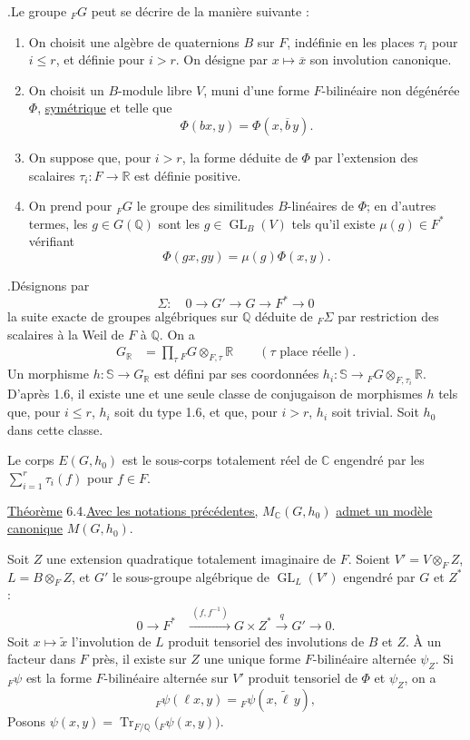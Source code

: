 \documentclass[10pt]{article}
\newcommand{\C}{\mathbb C}
\newcommand{\Q}{\mathbb Q}
\newcommand{\R}{\mathbb R}
\newcommand{\bS}{\mathbb S}
\newcommand{\GL}{\operatorname{GL}}
\newcommand{\MC}{M_{\C}}
\newcommand{\Tr}{\operatorname{Tr}}
\begin{document}
.\quad Le groupe ${}_FG$ peut se décrire de la manière suivante :
\begin{enumerate}[label=(\alph*)]
\item On choisit une algèbre de quaternions $B$ sur $F$, indéfinie en les places $\tau_i$ pour $i\le r$, et définie pour $i>r$. On désigne par $x\mapsto\overline{x}$ son involution canonique.
\item On choisit un $B$-module libre $V$, muni d'une forme $F$-bilinéaire non dégénérée $\Phi$, \uline{symétrique} et telle que
\[
\Phi(bx,y)=\Phi(x,\overline b\,y).
\]
\item On suppose que, pour $i>r$, la forme déduite de $\Phi$ par l'extension des scalaires $\tau_i:F\to\R$ est définie positive.
\item On prend pour ${}_FG$ le groupe des similitudes $B$-linéaires de $\Phi$; en d'autres termes, les $g\in G(\Q)$ sont les $g\in\GL_B(V)$ tels qu'il existe $\mu(g)\in F^*$ vérifiant
\[
\Phi(gx,gy)=\mu(g)\Phi(x,y).
\]
\end{enumerate}
.\quad Désignons par
\[
\Sigma:\quad 0\longrightarrow G'\longrightarrow G\longrightarrow F^*\longrightarrow0
\]
la suite exacte de groupes algébriques sur $\Q$ déduite de ${}_F\Sigma$ par restriction des scalaires à la Weil de $F$ à $\Q$. On a
\begingroup
\makeatletter
\tagsleft@true
\makeatother
\begin{align}
G_{\R}&=\prod_{\tau}{}_FG\otimes_{F,\tau}\R
\qquad(\tau\text{ place réelle}). \tag{6.3.1}
\end{align}
\endgroup
Un morphisme $h:\bS\to G_\R$ est défini par ses coordonnées $h_i:\bS\longrightarrow {}_FG\otimes_{F,\tau_i}\R$.
D'après 1.6, il existe une et une seule classe de conjugaison de morphismes $h$ tels que, pour $i\le r$, $h_i$ soit du type 1.6, et que, pour $i>r$, $h_i$ soit trivial. Soit $h_0$ dans cette classe.

Le corps $E(G,h_0)$ est le sous-corps totalement réel de $\C$ engendré par les $\displaystyle\sum_{i=1}^r\tau_i(f)$ pour $f\in F$.

\noindent \uline{Théorème} 6.4.\quad \uline{Avec les notations précédentes,} $\MC(G,h_0)$ \uline{admet un modèle canonique} $M(G,h_0)$.

Soit $Z$ une extension quadratique totalement imaginaire de $F$. Soient $V'=V\otimes_F Z$, $L=B\otimes_F Z$, et $G'$ le sous-groupe algébrique de $\GL_L(V')$ engendré par $G$ et $Z^*$ :
\begingroup
\makeatletter
\tagsleft@true
\makeatother
\begin{align}
0\longrightarrow F^*&\xrightarrow{\ (f,f^{-1})\ }G\times Z^*
 \xrightarrow{\ q\ }G'\longrightarrow0. \tag{6.4.1}
\end{align}
\endgroup
Soit $x\mapsto\widetilde x$ l'involution de $L$ produit tensoriel des involutions de $B$ et $Z$. À un facteur dans $F$ près, il existe sur $Z$ une unique forme $F$-bilinéaire alternée $\psi_Z$. Si ${}_F\psi$ est la forme $F$-bilinéaire alternée sur $V'$ produit tensoriel de $\Phi$ et $\psi_Z$, on a
\[
{}_F\psi(\ell x,y)={}_F\psi(x,\widetilde\ell\,y),
\]
Posons $\psi(x,y)=\Tr_{F/\Q}\bigl({}_F\psi(x,y)\bigr)$.
\end{document}
